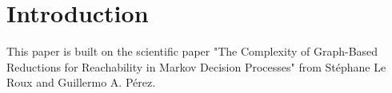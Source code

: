 \section{Introduction}
\label{sec:introduction}
This paper is built on the scientific paper 
"The Complexity of Graph-Based Reductions for Reachability in Markov Decision Processes" 
from Stéphane Le Roux and Guillermo A. Pérez. \cite{10.1007/978-3-319-89366-2_20}